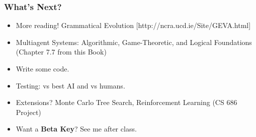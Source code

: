 \documentclass[]{beamer}
\begin{document}


\begin{frame}
\frametitle{What's Next?}
  \begin{itemize}
   \item More reading! Grammatical Evolution [http://ncra.ucd.ie/Site/GEVA.html] 
   \item Multiagent Systems: Algorithmic, Game-Theoretic,
and Logical Foundations (Chapter 7.7 from this Book) \cite{shoham2008multiagent}
	\item Write some code.
	\item Testing: vs best AI and vs humans.
	\item Extensions? Monte Carlo Tree Search, Reinforcement Learning (CS 686 Project)
	\item Want a \textbf{Beta Key}? See me after class.

  \end{itemize}
  
\end{frame}





\end{document}
